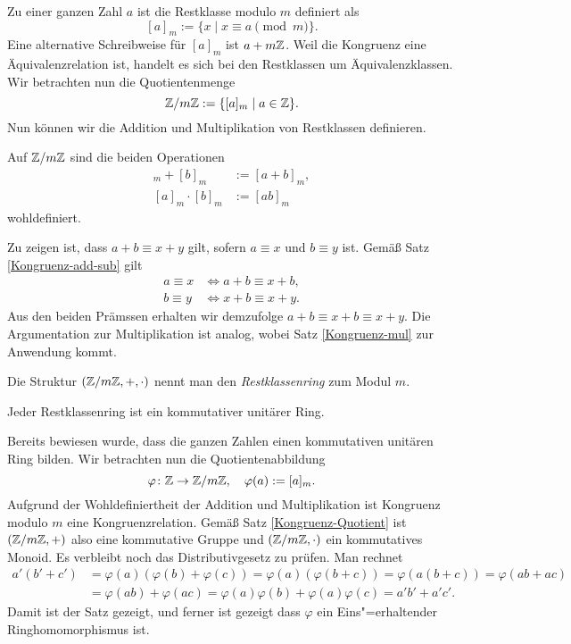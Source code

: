 Zu einer ganzen Zahl $a$ ist die Restklasse modulo $m$ definiert als 
\[[a]_m := \{x\mid x\equiv a\pmod m\}.\]
Eine alternative Schreibweise für $[a]_m$ ist $a+m\mathbb Z$. Weil die
Kongruenz eine Äquivalenzrelation ist, handelt es sich bei den
Restklassen um Äquivalenzklassen. Wir betrachten nun die
Quotientenmenge
\[\mathbb Z/m\mathbb Z := \{[a]_m\mid a\in\mathbb Z\}.\]
Nun können wir die Addition und Multiplikation von Restklassen
definieren.
\begin{Satz}
Auf $\mathbb Z/m\mathbb Z$ sind die beiden Operationen
\begin{align*}
[a]_m + [b]_m &:= [a+b]_m,\\
[a]_m\cdot [b]_m &:= [ab]_m
\end{align*}
wohldefiniert.
\end{Satz}
 Zu zeigen ist, dass $a+b\equiv x+y$ gilt, sofern
$a\equiv x$ und $b\equiv y$ ist. Gemäß Satz \ref{Kongruenz-add-sub} gilt
\begin{align*}
a\equiv x &\iff a+b\equiv x+b,\\
b\equiv y &\iff x+b\equiv x+y.
\end{align*}
Aus den beiden Prämssen erhalten wir demzufolge
$a+b\equiv x+b\equiv x+y$.
Die Argumentation zur Multiplikation ist analog, wobei
Satz \ref{Kongruenz-mul} zur Anwendung kommt.\,\qedsymbol

Die Struktur $(\mathbb Z/m\mathbb Z,+,\cdot)$ nennt man den \emph{Restklassenring}
zum Modul $m$.

\begin{Satz} Jeder Restklassenring ist ein kommutativer unitärer Ring.
\end{Satz}
 Bereits bewiesen wurde, dass die ganzen Zahlen einen
kommutativen unitären Ring bilden. Wir betrachten nun die
Quotientenabbildung
\[\varphi\colon\mathbb Z \to \mathbb Z/m\mathbb Z,\quad \varphi(a):=[a]_m.\]
Aufgrund der Wohldefiniertheit der Addition und Multiplikation ist
Kongruenz modulo $m$ eine Kongruenzrelation. Gemäß Satz
\ref{Kongruenz-Quotient} ist $(\mathbb Z/m\mathbb Z,+)$ also eine kommutative Gruppe
und $(\mathbb Z/m\mathbb Z,\cdot)$ ein kommutatives Monoid. Es verbleibt noch das
Distributivgesetz zu prüfen. Man rechnet
\begin{align*}
a'(b'+c') &= \varphi(a)(\varphi(b)+\varphi(c)) = \varphi(a)(\varphi(b+c))
= \varphi(a(b+c)) = \varphi(ab+ac)\\
&= \varphi(ab)+\varphi(ac) = \varphi(a)\varphi(b)+\varphi(a)\varphi(c)
= a'b'+a'c'.
\end{align*}
Damit ist der Satz gezeigt, und ferner ist gezeigt dass $\varphi$ ein
Eins"=erhaltender Ringhomomorphismus ist.\,\qedsymbol

